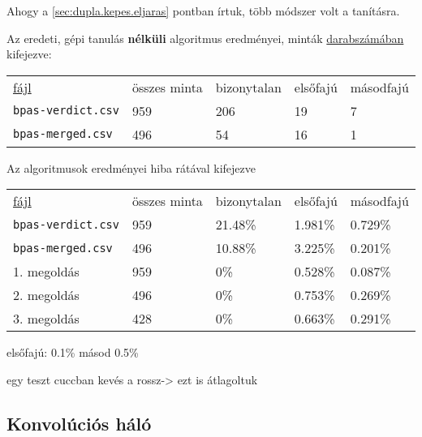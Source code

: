 Ahogy a \ref{sec:dupla.kepes.eljaras} pontban írtuk, több módszer volt a tanításra.

\noindent
Az eredeti, gépi tanulás \textbf{nélküli} algoritmus eredményei, minták \underline{darabszámában} 
kifejezve:

\begin{tabular}{ l l l l l }
	\underline{fájl} 			& összes minta 	& bizonytalan	& elsőfajú	& másodfajú \\
	\texttt{bpas-verdict.csv} 	& 959 			& 206 			& 19	 	& 7			\\
	\texttt{bpas-merged.csv} 	& 496			& 54 			& 16		& 1			\\
\end{tabular}


\noindent
Az algoritmusok eredményei hiba rátával kifejezve


\begin{tabular}{ l l l l l }
	\underline{fájl} 			& összes minta 	& bizonytalan	& elsőfajú	& másodfajú \\
	\texttt{bpas-verdict.csv} 	& 959 			& 21.48\%		& 1.981\% 	& 0.729\% 	\\
	\texttt{bpas-merged.csv} 	& 496			& 10.88\%		& 3.225\% 	& 0.201\%   \\
	\hline
	1. megoldás					& 959			& 0\%			& 0.528\%	& 0.087\%	\\
	2. megoldás					& 496			& 0\%			& 0.753\%	& 0.269\%	\\
	3. megoldás					& 428			& 0\%			& 0.663\%	& 0.291\%   \\
	
\end{tabular}

elsőfajú: 0.1\%
másod 0.5\%






egy teszt cuccban kevés a rossz-> ezt is átlagoltuk


\newpage
\subsection{Konvolúciós háló}




